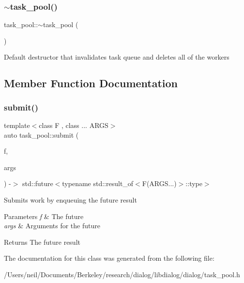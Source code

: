 \subsubsection{\texorpdfstring{$\sim$task\+\_\+pool()}{~task\_pool()}}
{\footnotesize\ttfamily task\+\_\+pool\+::$\sim$task\+\_\+pool (\begin{DoxyParamCaption}{ }\end{DoxyParamCaption})\hspace{0.3cm}{\ttfamily [inline]}}

Default destructor that invalidates task queue and deletes all of the workers 

\subsection{Member Function Documentation}
\mbox{\label{classtask__pool_a1278806d5bf37f76983db19ec64712b5}} 
\subsubsection{\texorpdfstring{submit()}{submit()}}
{\footnotesize\ttfamily template$<$class F , class ... A\+R\+GS$>$ \\
auto task\+\_\+pool\+::submit (\begin{DoxyParamCaption}\item[{F \&\&}]{f,  }\item[{A\+R\+GS \&\&...}]{args }\end{DoxyParamCaption}) -\/$>$ std\+::future$<$typename std\+::result\+\_\+of$<$F(A\+R\+G\+S...)$>$\+::type$>$ \hspace{0.3cm}{\ttfamily [inline]}}

Submits work by enqueuing the future result 
\begin{DoxyParams}{Parameters}
{\em f} & The future \\
\hline
{\em args} & Arguments for the future \\
\hline
\end{DoxyParams}
\begin{DoxyReturn}{Returns}
The future result 
\end{DoxyReturn}


The documentation for this class was generated from the following file\+:\begin{DoxyCompactItemize}
\item 
/\+Users/neil/\+Documents/\+Berkeley/research/dialog/libdialog/dialog/task\+\_\+pool.\+h\end{DoxyCompactItemize}
